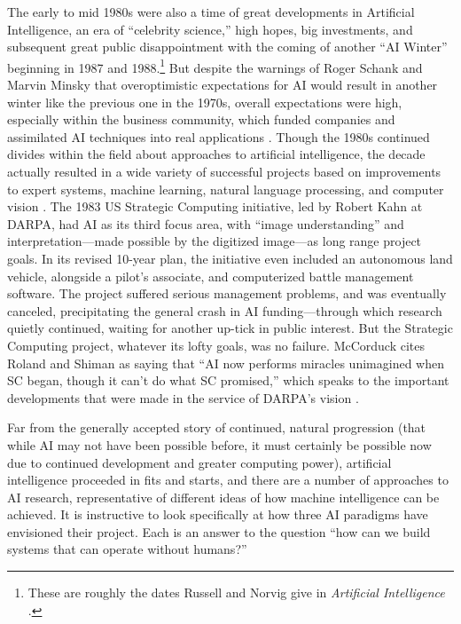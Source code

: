 The early to mid 1980s were also a time of great developments in
Artificial Intelligence, an era of ``celebrity science,'' high hopes,
big investments, and subsequent great public disappointment with the
coming of another ``AI Winter'' beginning in 1987 and
1988.\footnote{These are roughly the dates Russell and Norvig give in
  \emph{Artificial Intelligence} \cite{russellnorvig}.} But despite the
warnings of Roger Schank and Marvin Minsky that overoptimistic
expectations for AI would result in another winter like the previous
one in the 1970s, overall expectations were high, especially within
the business community, which funded companies and assimilated AI
techniques into real applications \cite[Afterword]{mccorduck}. Though
the 1980s continued divides 
within the field about approaches to artificial intelligence, the decade
actually resulted in a wide variety of successful projects based on
improvements to expert systems, machine learning, natural language
processing, and computer vision \cite[Afterword]{mccorduck}. The 1983 US Strategic Computing
initiative, led by Robert Kahn at DARPA, had AI as its third focus
area, with ``image understanding'' and interpretation---made possible by
the digitized image---as long range project goals. In its revised
10-year plan, the initiative even included an autonomous land vehicle,
alongside a pilot's associate, and computerized battle management
software. The project suffered serious management problems, and
was eventually canceled, precipitating the general crash in AI
funding---through which research quietly continued, waiting for another
up-tick in public interest. But the Strategic Computing project,
whatever its lofty goals, was no failure. McCorduck cites Roland and
Shiman as saying that ``AI now performs miracles unimagined when SC
began, though it can't do what SC promised,'' which speaks to the
important developments that were made in the service of DARPA's vision
\cite[Afterword]{mccorduck}.


Far from the generally accepted story of continued, natural
progression (that while AI may not have been possible before, it must
certainly be possible now due to continued development and greater
computing power), artificial intelligence proceeded in fits and
starts, and there are a number of approaches to AI research,
representative of different
ideas of how machine intelligence can be achieved. It is instructive
to look specifically at how three AI paradigms have envisioned their project.
Each is an answer to the question ``how can we build systems that
can operate without humans?''

